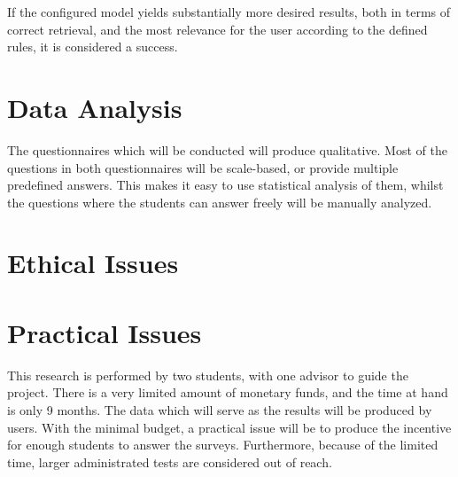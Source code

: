 If the configured model yields substantially more desired results, both in terms of correct retrieval, and the most relevance for the user according to the defined rules, it is considered a success.

\section{Data Analysis}

The questionnaires which will be conducted will produce qualitative. Most of the questions in both questionnaires will be scale-based, or provide multiple predefined answers. This makes it easy to use statistical analysis of them, whilst the questions where the students can answer freely will be manually analyzed. 

\section{Ethical Issues}

\section{Practical Issues}
This research is performed by two students, with one advisor to guide the project. There is a very limited amount of monetary funds, and the time at hand is only 9 months. The data which will serve as the results will be produced by users. With the minimal budget, a practical issue will be to produce the incentive for enough students to answer the surveys. Furthermore, because of the limited time, larger administrated tests are considered out of reach. 

\cleardoublepage
